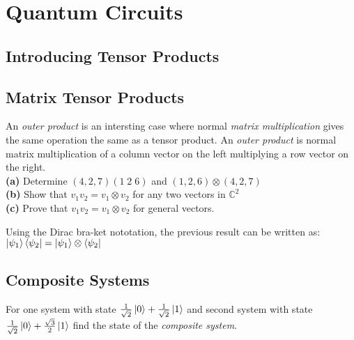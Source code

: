 
\chapter{Quantum Circuits}


\section{Introducing Tensor Products}

\section{Matrix Tensor Products}

\begin{example}
An \textit{outer product} is an intersting case where normal \textit{matrix multiplication} 
gives the same operation the same as a tensor product. 
An \textit{outer product} is normal matrix multiplication of a column vector on the left multiplying 
a row vector on the right. \\
\textbf{(a)} Determine $(4,2,7)(1\; 2\; 6)$ and $(1,2,6) \otimes (4,2,7)$   \\ 
\textbf{(b)} Show that $v_1 v_2 = v_1 \otimes v_2$ for any two vectors in $\mathbb{C}^2$  \\ 
\textbf{(c)} Prove that $v_1 v_2 = v_1 \otimes v_2$ for general vectors.

\end{example}

\frmrule

Using the Dirac bra-ket nototation, the previous result can 
be written as: $\left|\psi_1\right\rangle\left\langle\psi_2\right| = \left|\psi_1\right\rangle \otimes \left\langle\psi_2\right|$

\section{Composite Systems}

\begin{example}
For one system with state $\frac{1}{\sqrt{2}} \left|0\right\rangle + \frac{1}{\sqrt{2}} \left|1\right\rangle$
and second system with state $\frac{1}{\sqrt{2}} \left|0\right\rangle + \frac{\sqrt{3}}{2} \left|1\right\rangle$ 
find the state of the \textit{composite system}.
\end{example}


\frmrule

